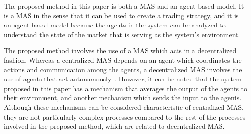 ﻿\documentclass{ieeeaccess}
\begin{document}
The proposed method in this paper is both a MAS and an
agent-based model. %
It is a MAS in the sense that it can be used
to create a trading strategy, and it is an agent-based model because the agents
in the system can be analyzed to understand the state of the market that is
serving as the system's environment. %



The proposed method involves the use of a MAS which acts in a
decentralized fashion. Whereas a centralized MAS depends on an
agent which coordinates the actions and communication among the agents, a
decentralized MAS involves the use of agents that act
autonomously~\cite{andreadis2014classification}. However, it can be noted that
the system proposed in this paper has a mechanism that averages the output of
the agents to their environment, and another mechanism which sends the input to
the agents. Although these mechanisms can be considered characteristic of
centralized MAS, they are not particularly complex processes
compared to the rest of the processes involved in the proposed method, which are
related to decentralized MAS. %
\end{document}
